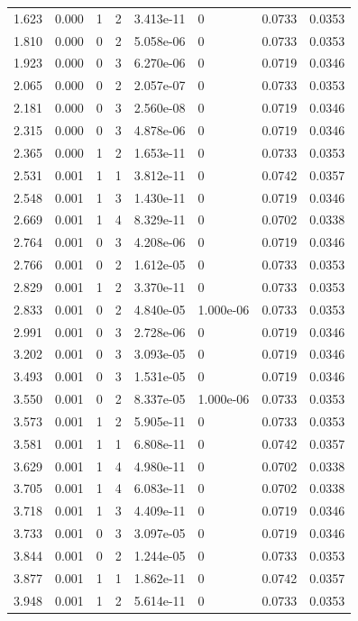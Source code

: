 \documentclass[preview]{standalone}
\begin{document}
{{\begin{tabular}{L{1.2cm}C{1.2cm} C{0.3cm}C{0.5cm} C{1.4cm}C{1.4cm} C{1.4cm}C{1.4cm}}
  1.623  &  0.000  & 1     &  2 &  3.413e-11  & 0  & 0.0733 &  0.0353   \\ 
  1.810  &  0.000  & 0     &  2 &  5.058e-06  & 0  & 0.0733 &  0.0353   \\ 
  1.923  &  0.000  & 0     &  3 &  6.270e-06  & 0  & 0.0719 &  0.0346   \\ 
  2.065  &  0.000  & 0     &  2 &  2.057e-07  & 0  & 0.0733 &  0.0353   \\ 
  2.181  &  0.000  & 0     &  3 &  2.560e-08  & 0  & 0.0719 &  0.0346   \\ 
  2.315  &  0.000  & 0     &  3 &  4.878e-06  & 0  & 0.0719 &  0.0346   \\ 
  2.365  &  0.000  & 1     &  2 &  1.653e-11  & 0  & 0.0733 &  0.0353   \\ 
  2.531  &  0.001  & 1     &  1 &  3.812e-11  & 0  & 0.0742 &  0.0357   \\ 
  2.548  &  0.001  & 1     &  3 &  1.430e-11  & 0  & 0.0719 &  0.0346   \\ 
  2.669  &  0.001  & 1     &  4 &  8.329e-11  & 0  & 0.0702 &  0.0338   \\ 
  2.764  &  0.001  & 0     &  3 &  4.208e-06  & 0  & 0.0719 &  0.0346   \\ 
  2.766  &  0.001  & 0     &  2 &  1.612e-05  & 0  & 0.0733 &  0.0353   \\ 
  2.829  &  0.001  & 1     &  2 &  3.370e-11  & 0  & 0.0733 &  0.0353   \\ 
  2.833  &  0.001  & 0     &  2 &  4.840e-05  & 1.000e-06  & 0.0733 &  0.0353   \\ 
  2.991  &  0.001  & 0     &  3 &  2.728e-06  & 0  & 0.0719 &  0.0346   \\ 
  3.202  &  0.001  & 0     &  3 &  3.093e-05  & 0  & 0.0719 &  0.0346   \\ 
  3.493  &  0.001  & 0     &  3 &  1.531e-05  & 0  & 0.0719 &  0.0346   \\ 
  3.550  &  0.001  & 0     &  2 &  8.337e-05  & 1.000e-06  & 0.0733 &  0.0353   \\ 
  3.573  &  0.001  & 1     &  2 &  5.905e-11  & 0  & 0.0733 &  0.0353   \\ 
  3.581  &  0.001  & 1     &  1 &  6.808e-11  & 0  & 0.0742 &  0.0357   \\ 
  3.629  &  0.001  & 1     &  4 &  4.980e-11  & 0  & 0.0702 &  0.0338   \\ 
  3.705  &  0.001  & 1     &  4 &  6.083e-11  & 0  & 0.0702 &  0.0338   \\ 
  3.718  &  0.001  & 1     &  3 &  4.409e-11  & 0  & 0.0719 &  0.0346   \\ 
  3.733  &  0.001  & 0     &  3 &  3.097e-05  & 0  & 0.0719 &  0.0346   \\ 
  3.844  &  0.001  & 0     &  2 &  1.244e-05  & 0  & 0.0733 &  0.0353   \\ 
  3.877  &  0.001  & 1     &  1 &  1.862e-11  & 0  & 0.0742 &  0.0357   \\ 
  3.948  &  0.001  & 1     &  2 &  5.614e-11  & 0  & 0.0733 &  0.0353   \\ 
\hline 
\end{tabular} 

}}
\end{document}
